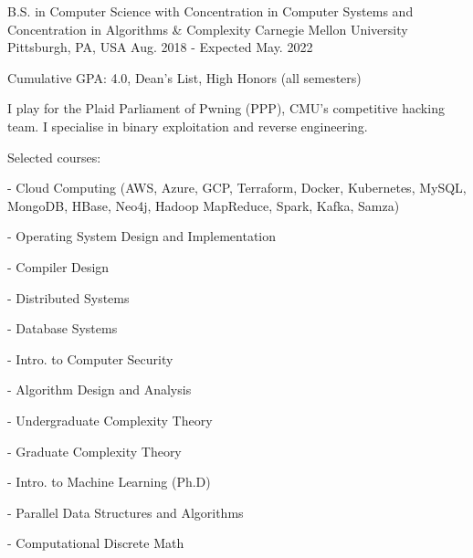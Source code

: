 

\begin{cventries}

  \cventry
    {B.S. in Computer Science with Concentration in Computer Systems and Concentration in Algorithms \& Complexity} %
    {Carnegie Mellon University} %
    {Pittsburgh, PA, USA} %
    {Aug. 2018 - Expected May. 2022} %
    {
      \begin{cvitems} %
      \item {Cumulative GPA: 4.0, Dean's List, High Honors (all semesters)}
      \item {I play for the Plaid Parliament of Pwning (PPP), CMU's competitive hacking team. I specialise in binary exploitation and reverse engineering.}
      \item {Selected courses:}
      \item[-] {Cloud Computing (AWS, Azure, GCP, Terraform, Docker, Kubernetes, MySQL, MongoDB, HBase, Neo4j, Hadoop MapReduce, Spark, Kafka, Samza)}
        \setlength\multicolsep{0pt}
        \begin{multicols}{3}
          \item[-] {Operating System Design and Implementation}
          \item[-] {Compiler Design}
          \item[-] {Distributed Systems}
          \item[-] {Database Systems}
          \item[-] {Intro. to Computer Security}
          \item[-] {Algorithm Design and Analysis}
          \item[-] {Undergraduate Complexity Theory}
          \item[-] {Graduate Complexity Theory}
          \item[-] {Intro. to Machine Learning (Ph.D)}
          \item[-] {Parallel Data Structures and Algorithms}
          \item[-] {Computational Discrete Math}

\end{multicols}
\end{cvitems}}
\end{cventries}
